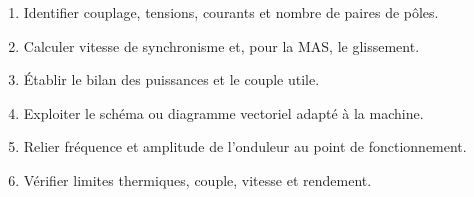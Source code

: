 \documentclass[10pt,a3paper]{article}
\begin{document}
\vfill
\begin{TLPosterMethode}
\begin{enumerate}
  \item Identifier couplage, tensions, courants et nombre de paires de pôles.
  \item Calculer vitesse de synchronisme et, pour la MAS, le glissement.
  \item Établir le bilan des puissances et le couple utile.
  \item Exploiter le schéma ou diagramme vectoriel adapté à la machine.
  \item Relier fréquence et amplitude de l'onduleur au point de fonctionnement.
  \item Vérifier limites thermiques, couple, vitesse et rendement.
\end{enumerate}
\end{TLPosterMethode}
\vfill
{}
\end{document}
